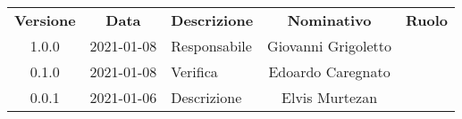 {
    \renewcommand{\arraystretch}{1.5}
    \centering
    \begin{longtable}{ c c  C{4cm}  c  c }
        \rowcolor{\primaryColor}
        \textcolor{\secondaryColor}{
        \textbf{Versione}}     & \textcolor{\secondaryColor}{\textbf{Data}}       & \textcolor{\secondaryColor}
        {\textbf{Descrizione}} & \textcolor{\secondaryColor}{\textbf{Nominativo}} & \textcolor{\secondaryColor}{\textbf{Ruolo}}                          \\


        1.0.0                  & 2021-01-08                                       & Responsabile                                & Giovanni Grigoletto & \responsabile{} \\
        0.1.0                  & 2021-01-08                                       & Verifica                                    & Edoardo Caregnato & \verificatore{} \\
        0.0.1                  & 2021-01-06                                       & Descrizione                            & Elvis Murtezan & \redattore{}    \\
    \end{longtable}
}